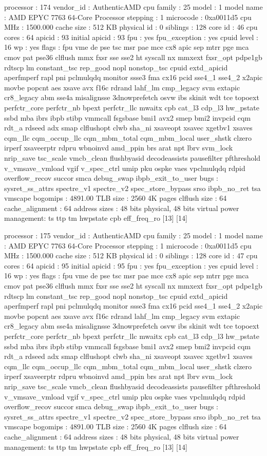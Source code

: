 processor	: 174
vendor_id	: AuthenticAMD
cpu family	: 25
model		: 1
model name	: AMD EPYC 7763 64-Core Processor
stepping	: 1
microcode	: 0xa0011d5
cpu MHz		: 1500.000
cache size	: 512 KB
physical id	: 0
siblings	: 128
core id		: 46
cpu cores	: 64
apicid		: 93
initial apicid	: 93
fpu		: yes
fpu_exception	: yes
cpuid level	: 16
wp		: yes
flags		: fpu vme de pse tsc msr pae mce cx8 apic sep mtrr pge mca cmov pat pse36 clflush mmx fxsr sse sse2 ht syscall nx mmxext fxsr_opt pdpe1gb rdtscp lm constant_tsc rep_good nopl nonstop_tsc cpuid extd_apicid aperfmperf rapl pni pclmulqdq monitor ssse3 fma cx16 pcid sse4_1 sse4_2 x2apic movbe popcnt aes xsave avx f16c rdrand lahf_lm cmp_legacy svm extapic cr8_legacy abm sse4a misalignsse 3dnowprefetch osvw ibs skinit wdt tce topoext perfctr_core perfctr_nb bpext perfctr_llc mwaitx cpb cat_l3 cdp_l3 hw_pstate ssbd mba ibrs ibpb stibp vmmcall fsgsbase bmi1 avx2 smep bmi2 invpcid cqm rdt_a rdseed adx smap clflushopt clwb sha_ni xsaveopt xsavec xgetbv1 xsaves cqm_llc cqm_occup_llc cqm_mbm_total cqm_mbm_local user_shstk clzero irperf xsaveerptr rdpru wbnoinvd amd_ppin brs arat npt lbrv svm_lock nrip_save tsc_scale vmcb_clean flushbyasid decodeassists pausefilter pfthreshold v_vmsave_vmload vgif v_spec_ctrl umip pku ospke vaes vpclmulqdq rdpid overflow_recov succor smca debug_swap ibpb_exit_to_user
bugs		: sysret_ss_attrs spectre_v1 spectre_v2 spec_store_bypass srso ibpb_no_ret tsa vmscape
bogomips	: 4891.00
TLB size	: 2560 4K pages
clflush size	: 64
cache_alignment	: 64
address sizes	: 48 bits physical, 48 bits virtual
power management: ts ttp tm hwpstate cpb eff_freq_ro [13] [14]

processor	: 175
vendor_id	: AuthenticAMD
cpu family	: 25
model		: 1
model name	: AMD EPYC 7763 64-Core Processor
stepping	: 1
microcode	: 0xa0011d5
cpu MHz		: 1500.000
cache size	: 512 KB
physical id	: 0
siblings	: 128
core id		: 47
cpu cores	: 64
apicid		: 95
initial apicid	: 95
fpu		: yes
fpu_exception	: yes
cpuid level	: 16
wp		: yes
flags		: fpu vme de pse tsc msr pae mce cx8 apic sep mtrr pge mca cmov pat pse36 clflush mmx fxsr sse sse2 ht syscall nx mmxext fxsr_opt pdpe1gb rdtscp lm constant_tsc rep_good nopl nonstop_tsc cpuid extd_apicid aperfmperf rapl pni pclmulqdq monitor ssse3 fma cx16 pcid sse4_1 sse4_2 x2apic movbe popcnt aes xsave avx f16c rdrand lahf_lm cmp_legacy svm extapic cr8_legacy abm sse4a misalignsse 3dnowprefetch osvw ibs skinit wdt tce topoext perfctr_core perfctr_nb bpext perfctr_llc mwaitx cpb cat_l3 cdp_l3 hw_pstate ssbd mba ibrs ibpb stibp vmmcall fsgsbase bmi1 avx2 smep bmi2 invpcid cqm rdt_a rdseed adx smap clflushopt clwb sha_ni xsaveopt xsavec xgetbv1 xsaves cqm_llc cqm_occup_llc cqm_mbm_total cqm_mbm_local user_shstk clzero irperf xsaveerptr rdpru wbnoinvd amd_ppin brs arat npt lbrv svm_lock nrip_save tsc_scale vmcb_clean flushbyasid decodeassists pausefilter pfthreshold v_vmsave_vmload vgif v_spec_ctrl umip pku ospke vaes vpclmulqdq rdpid overflow_recov succor smca debug_swap ibpb_exit_to_user
bugs		: sysret_ss_attrs spectre_v1 spectre_v2 spec_store_bypass srso ibpb_no_ret tsa vmscape
bogomips	: 4891.00
TLB size	: 2560 4K pages
clflush size	: 64
cache_alignment	: 64
address sizes	: 48 bits physical, 48 bits virtual
power management: ts ttp tm hwpstate cpb eff_freq_ro [13] [14]

